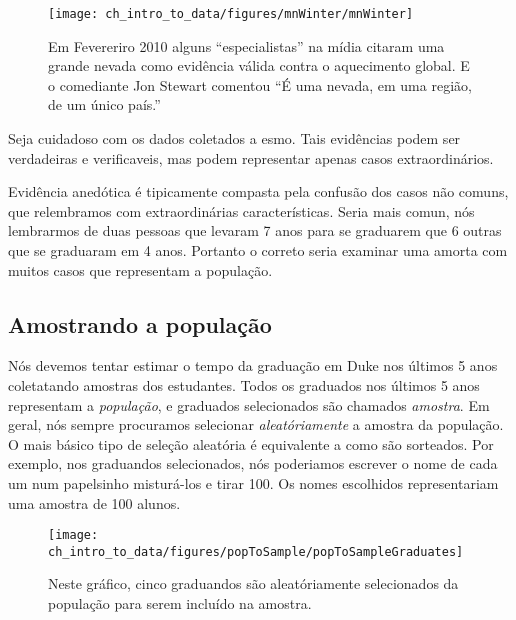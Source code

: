 \setlength{\captionwidth}{\textwidth-80mm}
\begin{figure}
\centering
\hspace{8mm}\texttt{[image: ch\_intro\_to\_data/figures/mnWinter/mnWinter]}\hspace{4mm}
\begin{minipage}[b]{\textwidth - 80mm}
   \caption[evidência anedótica]{Em Fevereriro 2010 alguns ``especialistas'' na mídia citaram uma grande nevada como evidência válida contra o aquecimento global. E o comediante Jon Stewart comentou ``É uma nevada, em uma região, de um único país.''
   \label{mnWinter}}
\end{minipage}
\end{figure}
\setlength{\captionwidth}{\mycaptionwidth}

\begin{termBox}{
Seja cuidadoso com os dados coletados a esmo. Tais evidências podem ser verdadeiras e verificaveis, mas podem representar apenas casos extraordinários.}
\end{termBox}

Evidência anedótica é tipicamente compasta pela confusão dos casos não comuns, que relembramos com extraordinárias características. Seria mais comun,  nós lembrarmos de duas pessoas que levaram 7 anos para se graduarem que 6 outras que se graduaram em 4 anos. Portanto o correto seria examinar uma amorta com muitos casos que representam a população.

\subsection{Amostrando a população}

Nós devemos tentar estimar o tempo da graduação em Duke nos últimos 5 anos coletatando amostras dos estudantes. Todos os graduados nos últimos 5 anos representam a \emph{população}, e graduados selecionados são chamados \emph{amostra}. Em geral, nós sempre procuramos selecionar \emph{aleatóriamente} a amostra da população. O mais básico tipo de seleção aleatória é equivalente a como são sorteados. Por exemplo, nos graduandos selecionados, nós poderiamos escrever o nome de cada um num papelsinho misturá-los e tirar 100. Os nomes escolhidos representariam uma amostra de 100 alunos.

\begin{figure}[ht]
\centering
\texttt{[image: ch\_intro\_to\_data/figures/popToSample/popToSampleGraduates]}
\caption{Neste gráfico, cinco graduandos são aleatóriamente selecionados da população para serem incluído na amostra.}
\label{popToSampleGraduates}
\end{figure}


